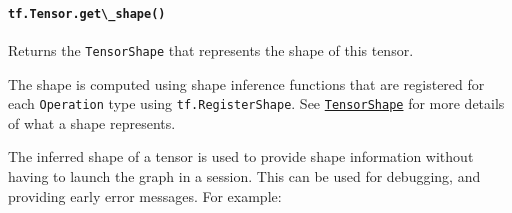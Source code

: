 \paragraph{\texorpdfstring{\lstinline{tf.Tensor.get\_shape()}
}{tf.Tensor.get\_shape() }}\label{tf.tensor.getux5fshape}

Returns the \lstinline{TensorShape} that represents the shape of this
tensor.

The shape is computed using shape inference functions that are
registered for each \lstinline{Operation} type using
\lstinline{tf.RegisterShape}. See
\href{../../api_docs/python/framework.md\#TensorShape}{\lstinline{TensorShape}}
for more details of what a shape represents.

The inferred shape of a tensor is used to provide shape information
without having to launch the graph in a session. This can be used for
debugging, and providing early error messages. For example:

\begin{Shaded}
\begin{Highlighting}[]
\OperatorTok{=} \NormalTok{tf.constant([[}\NormalTok{, }\NormalTok{, }\NormalTok{], [}\NormalTok{, }\NormalTok{, }\NormalTok{]])}

 
\OperatorTok{==>} \NormalTok{TensorShape([Dimension(}\NormalTok{)])}

\OperatorTok{=} \NormalTok{tf.constant([[}\NormalTok{, }\NormalTok{], [}\NormalTok{, }\NormalTok{], [}\NormalTok{, }\NormalTok{], [}\NormalTok{, }\NormalTok{]])}

 
\OperatorTok{==>} \NormalTok{TensorShape([Dimension(}\NormalTok{)])}

\OperatorTok{=} 

\OperatorTok{=} \OperatorTok{=}\OperatorTok{=}\NormalTok{)}

 
\OperatorTok{==>} \NormalTok{TensorShape([Dimension(}\NormalTok{)])}
\end{Highlighting}
\end{Shaded}

